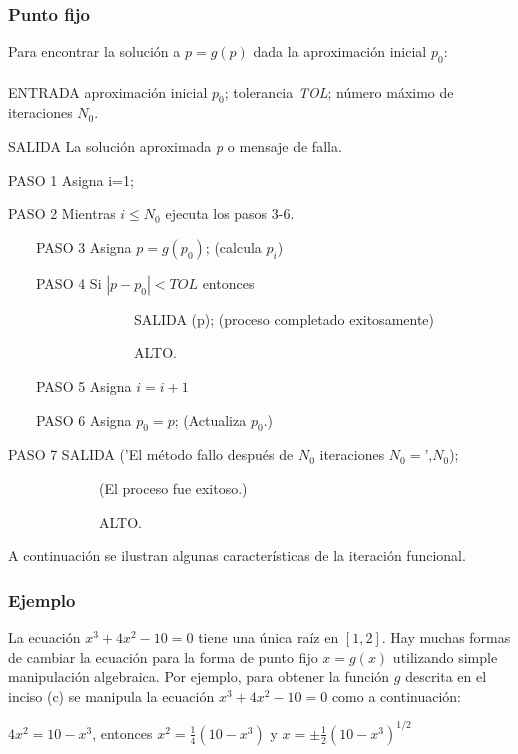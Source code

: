 \begin{tcolorbox}[colback=blue!15!]
\subsubsection*{Punto fijo}
Para encontrar la solución a $p=g(p)$ dada la aproximación inicial $p_0$:
\\ \\
ENTRADA aproximación inicial $p_0$; tolerancia \textit{TOL}; número máximo de iteraciones $N_0$.

SALIDA La solución aproximada \textit{p} o mensaje de falla.

PASO 1 Asigna i=1;

PASO 2 Mientras $i\leq N_0$ ejecuta los pasos 3-6.

\ \ \ \  PASO 3 Asigna $p=g(p_0)$; (calcula $p_i$)

\ \ \ \  PASO 4 Si $|p-p_0|<TOL$ entonces

\ \ \ \ \ \ \ \ \ \ \ \ \ \ \ \ \ \ SALIDA (p); (proceso completado exitosamente)

\ \ \ \ \ \ \ \ \ \ \ \ \ \ \ \ \ \ ALTO.

\ \ \ \   PASO 5 Asigna $i=i+1$
    
\ \ \ \   PASO 6 Asigna $p_0=p$; (Actualiza $p_0$.)

PASO 7 SALIDA ('El método fallo después de $N_0$ iteraciones $N_0=$',$N_0$);

\ \ \ \ \ \ \ \ \ \ \ \ \ (El proceso fue exitoso.)

\ \ \ \ \ \ \ \ \ \ \ \ \ ALTO.


\end{tcolorbox}

A continuación se ilustran algunas características de la iteración funcional.

\subsubsection*{Ejemplo}
La ecuación $x^3+4x^2-10=0$ tiene una única raíz en $[1,2]$. Hay muchas formas de cambiar la ecuación para la forma de punto fijo $x=g(x)$ utilizando simple manipulación algebraica. Por ejemplo, para obtener la función $g$ descrita en el inciso (c) se manipula la ecuación $x^3+4x^2-10=0$ como a continuación:

\begin{center}
$4x^2=10-x^3$, entonces $x^2=\frac{1}{4}(10-x^3)$ y $x=\pm\frac{1}{2}(10-x^3)^{1/2}$
\end{center}

